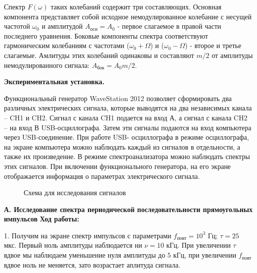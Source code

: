 \documentclass[14pt]{article}
\begin{document}
Спектр $F(\omega)$ таких колебаний содержит три составляющих. Основная компонента представляет собой исходное немодулированное колебание с несущей частотой $\omega_0$ и амплитудой $A_{\text{осн}} = A_0$ - первое слагаемое в правой части последнего уравнения. Боковые компоненты спектра соответствуют гармоническим колебаниям с частотами 
($\omega_0 + \Omega$) и ($\omega_0 - \Omega$) - второе и третье слагаемые. Амлитуды этих колебаний одинаковы и составляют $m/2$ от амплитуды немодулированного сигнала:
$A_{\text{бок}} = A_0m/2$.

\newpage
\textbf{Экспериментальная установка.} 

Функциональный генератор WaveStation 2012 позволяет сформировать два различных электрических сигнала, которые выводятся на два независимых канала – CH1 и CH2. Сигнал с канала CH1 подается на вход А, а сигнал с канала CH2 – на вход В USB-осциллографа. Затем эти сигналы подаются на вход компьютера через USB-соединение. При работе USB- осциллографа в режиме осциллографа, на экране компьютера можно наблюдать каждый из сигналов в отдельности, а также их произведение. В режиме спектроанализатора можно наблюдать спектры этих сигналов. При включении функционального генератора, на его экране отображается информация о параметрах электрического сигнала.

\begin{figure}[h!]
	\caption{Схема для исследования сигналов}
	\label{fig:image}
\end{figure}

\newpage
\textbf{А. Исследование спектра периодической последовательности прямоугольных импульсов}
\vspace{1cm}
\textbf{Ход работы:}

1. Получим на экране спектр импульсов с параметрами $f_{\text{повт}} = 10^3$ Гц; $\tau = 25$ мкс. Первый ноль амплитуды наблюдается ни $\nu = 10$ кГц. При увеличении $\tau$ вдвое мы наблюдаем уменьшение нуля амплитуды до $5$ кГц, при увеличении $f_{\text{повт}}$ вдвое ноль не меняется, зато возрастает аплитуда сигнала.
\end{document}

